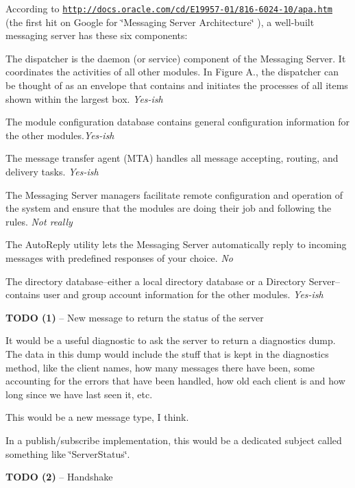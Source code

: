 According to \href{http://docs.oracle.com/cd/E19957-01/816-6024-10/apa.htm}{\tt http\-://docs.\-oracle.\-com/cd/\-E19957-\/01/816-\/6024-\/10/apa.\-htm} (the first hit on Google for \char`\"{}\-Messaging Server Architecture\char`\"{} ), a well-\/built messaging server has these six components\-: 
\begin{DoxyItemize}
\item The dispatcher is the daemon (or service) component of the Messaging Server. It coordinates the activities of all other modules. In Figure A., the dispatcher can be thought of as an envelope that contains and initiates the processes of all items shown within the largest box. {\itshape Yes-\/ish} 
\item The module configuration database contains general configuration information for the other modules.{\itshape Yes-\/ish} 
\item The message transfer agent (M\-T\-A) handles all message accepting, routing, and delivery tasks. {\itshape Yes-\/ish} 
\item The Messaging Server managers facilitate remote configuration and operation of the system and ensure that the modules are doing their job and following the rules. {\itshape Not really} 
\item The Auto\-Reply utility lets the Messaging Server automatically reply to incoming messages with predefined responses of your choice. {\itshape No} 
\item The directory database--either a local directory database or a Directory Server--contains user and group account information for the other modules. {\itshape Yes-\/ish} 
\end{DoxyItemize}

{\bfseries T\-O\-D\-O (1)} -- New message to return the status of the server

It would be a useful diagnostic to ask the server to return a diagnostics dump. The data in this dump would include the stuff that is kept in the diagnostics method, like the client names, how many messages there have been, some accounting for the errors that have been handled, how old each client is and how long since we have last seen it, etc.

This would be a new message type, I think.

In a publish/subscribe implementation, this would be a dedicated subject called something like \char`\"{}\-Server\-Status\char`\"{}.

{\bfseries T\-O\-D\-O (2)} -- Handshake

